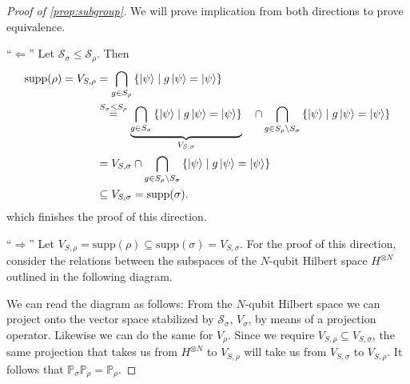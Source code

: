 \begin{proof}[Proof of \cref{prop:subgroup}]
  We will prove implication from both directions to prove equivalence.

  \enquote{$\Leftarrow$} Let $\mathcal{S}_\sigma \leq \mathcal{S}_\rho$. Then
  \begin{align*}
    \mathrm{supp}(\rho) = V_{S,\rho} &= \bigcap_{g\in S_\rho} \left\{ \ket{\psi} \mid
    g\ket{\psi} = \ket{\psi} \right\} \\
        &\overset{S_\sigma \leq S_\rho}{=} \underbrace{\bigcap_{g\in S_\sigma}
        \left\{\ket{\psi} \mid g \ket{\psi} =
        \ket{\psi}\right\}}_{V_{S,\sigma}}\ \ \ \cap \bigcap_{g \in S_\rho \setminus
        S_\sigma} \left\{\ket{\psi} \mid g \ket{\psi} =
        \ket{\psi}\right\}\\
        &= V_{S,\sigma} \cap \bigcap_{g \in S_\rho \setminus
        S_\sigma} \left\{\ket{\psi} \mid g \ket{\psi} =
        \ket{\psi}\right\}\\
        &\subseteq V_{S,\sigma} = \mathrm{supp}(\sigma)
  .\end{align*}
  which finishes the proof of this direction.

  \enquote{$\Rightarrow$} Let $V_{S,\rho} = \mathrm{supp}(\rho) \subseteq
  \mathrm{supp}(\sigma) = V_{S,\sigma}$. 
  For the proof of this direction, consider the relations between the subspaces
  of the $N$-qubit Hilbert space $H^{\otimes N}$ outlined in the following
  diagram.
  \begin{figure}[H]
    \centering
\end{figure}

  We can read the diagram as follows: From the $N$-qubit Hilbert space we can
  project onto the vector space stabilized by $\mathcal{S}_\sigma$, $V_\sigma$, by means of a
  projection operator. Likewise we can do the same for $V_\rho$. Since we
  require $V_{S,\rho} \subseteq V_{S,\sigma}$, the same projection that takes
  us from $H^{\otimes N}$ to $V_{S,\rho}$ will take us from $V_{S,\sigma}$ to
  $V_{S,\rho}$. It follows that $\mathbb{P}_\sigma \mathbb{P}_\rho = \mathbb{P}_\rho$.


\end{proof}
